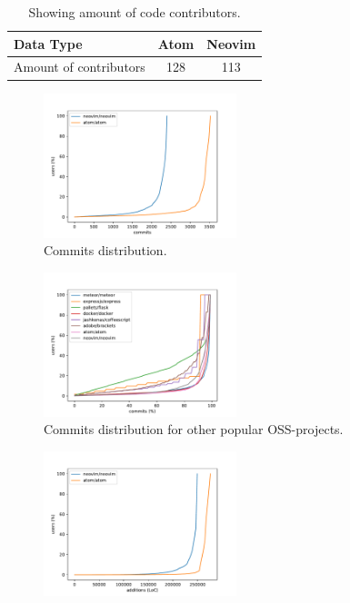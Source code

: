 \documentclass[a4paper,11pt]{article}
\begin{document}
{\begin{table}[h]
	\centering
	\begin{tabular}{ | l | c | c |}
		\hline
		\textbf{Data Type} 		& \textbf{Atom} 	& \textbf{Neovim}	\\\hline
		Amount of contributors	& 128		& 113		 	\\
		\hline
	\end{tabular}
	\caption{Showing amount of code contributors.}
	\label{tab:contributors_amount}
\end{table}
\begin{figure}[!h]
	\centering
	\includegraphics[width=0.5\textwidth]{commits_dist}
	\caption{Commits distribution.}
	\label{fig:commits_dist}
\end{figure}
\begin{figure}[!h]
	\centering
	\includegraphics[width=0.5\textwidth]{all_commits_dist}
	\caption{Commits distribution for other popular OSS-projects.}
	\label{fig:all_commits_dist}
\end{figure}
\begin{figure}[!h]
	\centering
	\includegraphics[width=0.5\textwidth]{additions_dist}

\end{figure}}
\end{document}
